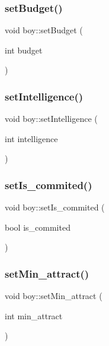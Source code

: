 \mbox{\label{classboy_aaf145f49ec525b3a66a9803ce8cf07c4}} 
\subsubsection{\texorpdfstring{set\+Budget()}{setBudget()}}
{\footnotesize\ttfamily void boy\+::set\+Budget (\begin{DoxyParamCaption}\item[{int}]{budget }\end{DoxyParamCaption})}

\mbox{\label{classboy_ac30638dc34282b9e3c2184c17c3747a4}} 
\subsubsection{\texorpdfstring{set\+Intelligence()}{setIntelligence()}}
{\footnotesize\ttfamily void boy\+::set\+Intelligence (\begin{DoxyParamCaption}\item[{int}]{intelligence }\end{DoxyParamCaption})}

\mbox{\label{classboy_a4b3da7e37c55db15f496e8f3bb1d3a2b}} 
\subsubsection{\texorpdfstring{set\+Is\+\_\+commited()}{setIs\_commited()}}
{\footnotesize\ttfamily void boy\+::set\+Is\+\_\+commited (\begin{DoxyParamCaption}\item[{bool}]{is\+\_\+commited }\end{DoxyParamCaption})}

\mbox{\label{classboy_a9969c10ff3d9cbf1318b638aa5746c89}} 
\subsubsection{\texorpdfstring{set\+Min\+\_\+attract()}{setMin\_attract()}}
{\footnotesize\ttfamily void boy\+::set\+Min\+\_\+attract (\begin{DoxyParamCaption}\item[{int}]{min\+\_\+attract }\end{DoxyParamCaption})}


